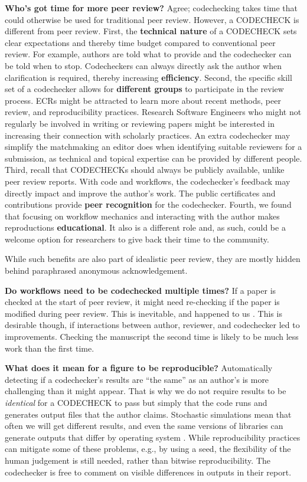 \documentclass[12pt]{article}
\begin{document}
\textbf{Who's got time for more peer review?} Agree; codechecking
takes time that could otherwise be used for traditional peer review.
However, a CODECHECK is different from peer review.  First, the
\textbf{technical nature} of a CODECHECK sets clear expectations and
thereby time budget compared to conventional peer review.  For
example, authors are told what to provide and the codechecker can be
told when to stop.  Codecheckers can always directly ask the author
when clarification is required, thereby increasing
\textbf{efficiency}.  Second, the specific skill set of a codechecker
allows for \textbf{different groups} to participate in the review
process.  ECRs might be attracted to learn more about recent methods,
peer review, and reproducibility practices.  Research Software
Engineers  %
who might not regularly be involved in writing or reviewing papers
might be interested in increasing their connection with scholarly
practices.  An extra codechecker may simplify the matchmaking an
editor does when identifying suitable reviewers for a submission,
as technical and topical expertise can be provided by different
people.  Third, recall that CODECHECKs should always be publicly
available, unlike peer review reports.  With code and workflows, the
codechecker's feedback may directly impact and improve the author's
work.  The public certificates and contributions provide \textbf{peer
  recognition} for the codechecker.  Fourth, we found that focusing on
workflow mechanics and interacting with the author makes reproductions
\textbf{educational}. It also is a different role and, as such, could
be a welcome option for researchers to give back their time to the
community.

While such benefits are also part of idealistic peer review, they are
mostly hidden behind paraphrased anonymous acknowledgement.

\textbf{Do workflows need to be codechecked multiple times?}  If a
paper is checked at the start of peer review, it might need
re-checking if the paper is modified during peer review.  This is
inevitable, and happened to us \cite{cert-2020-012}. This is desirable
though, if interactions between author, reviewer, and codechecker led
to improvements.  Checking the manuscript the second time is likely to
be much less work than the first time.

\textbf{What does it mean for a figure to be reproducible?}
Automatically detecting if a codechecker's results are ``the same'' as
an author's is more challenging than it might appear.  That is why we
do not require results to be \textit{identical} for a CODECHECK to
pass but simply that the code runs and generates output files that the
author claims. Stochastic simulations mean that often we will get
different results, and even the same versions of libraries can
generate outputs that differ by operating system
\cite{Gronenschild2012-pp}.  While reproducibility practices can
mitigate some of these problems, e.g., by using a seed, the
flexibility of the human judgement is still needed, rather than
bitwise reproducibility.  The codechecker is free to comment on
visible differences in outputs in their report.
\end{document}
